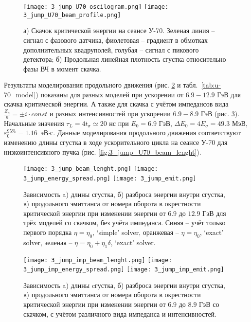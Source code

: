 \begin{figure}
   \texttt{[image: 3\_jump\_U70\_oscilogram.png]}
   \texttt{[image: 3\_jump\_U70\_beam\_profile.png]}
   \caption{а) Скачок критической энергии на сеансе У-70. Зеленая линия – сигнал с фазового датчика, фиолетовая – градиент в обмотках дополнительных квадруполей, голубая – сигнал с пикового детектора; б) Продольная линейная плотность сгустка относительно фазы ВЧ в момент скачка.}
   \label{fig:3_jump_U70_oscilogram}
\end{figure}

\par Результаты моделирования продольного движения (рис. \ref{fig:3_jump} и табл.~\ref{tab:u-70_model}) показаны для разных моделей при ускорении от $6.9-12.9$ ГэВ для скачка критической энергии. А также для скачка с учётом импедансов вида $\frac{Z_n}{n}=\pm i\cdot const$ и разных интенсивностей при ускорении $6.9-8.9$ ГэВ (рис. \ref{fig:3_jump_imp}). Начальные значения $\tau_L=4t_\sigma\simeq20$ нс при $E_0=6.9$ ГэВ, $\Delta E_{0} = 4E_{\sigma} =49.3$ МэВ, $\varepsilon_{0}^{95\%}=1.16$~эВ$\cdot$с. Данные моделирования продольного движения соответствуют изменению длины сгустка в ходе ускорительного цикла на сеансе У-70 для низкоинтенсивного пучка (рис. \ref{fig:3_jump_U70_beam_lenght}).

\begin{figure}
   \texttt{[image: 3\_jump\_beam\_lenght.png]}
   \texttt{[image: 3\_jump\_energy\_spread.png]}
   \texttt{[image: 3\_jump\_emit.png]}
   \caption{Зависимость a) длины сгустка, б) разброса энергии внутри сгустка, в) продольного эмиттанса от номера оборота в окрестности критической энергии при изменении энергии от $6.9$ до $12.9$ ГэВ для трёх моделей со скачком, без учёта импеданса. Синяя – учёт только первого порядка $\eta=\eta_0$, ‘simple’ solver, оранжевая – $\eta=\eta_0$, ‘exact’ solver, зеленая – $\eta=\eta_0+\eta_1\delta$, ‘exact’ solver.}
   \label{fig:3_jump}
\end{figure}

\begin{figure}
   \texttt{[image: 3\_jump\_imp\_beam\_lenght.png]}
   \texttt{[image: 3\_jump\_imp\_energy\_spread.png]}
   \texttt{[image: 3\_jump\_imp\_emit.png]}
   \caption{Зависимость a) длины cгустка, б) разброса энергии внутри сгустка, в) продольного эмиттанса от номера оборота в окрестности критической энергии при изменении энергии от $6.9$ до $8.9$ ГэВ со скачком, с учётом различного вида импеданса и интенсивностей.}
   \label{fig:3_jump_imp}
\end{figure}

